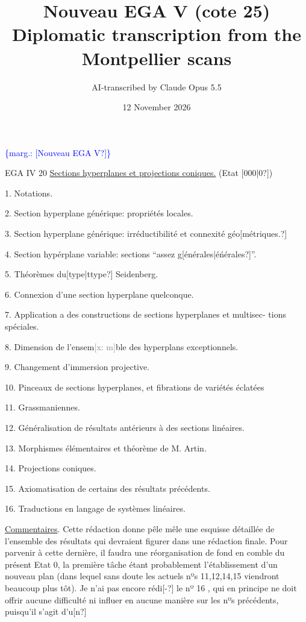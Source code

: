 \documentclass[11pt]{article}
\title{Nouveau EGA V (cote 25)\\[4pt]\large Diplomatic transcription from the Montpellier scans}
\author{AI-transcribed by Claude Opus 5.5}
\date{12 November 2026}
\newcommand{\scanpage}[1]{\par\bigskip\noindent{\small\sffamily[scan #1]}\par}
\newcommand{\mspage}[1]{{\small\sffamily[p.\,#1]}}
\newcommand{\margin}[1]{\textcolor{blue}{\{\textsf{marg.:} #1\}}}
\newcommand{\xout}[1]{\textcolor{gray}{[\textsf{x:} #1]}}
\newcommand{\uline}[1]{\underline{#1}}
\newcommand{\unsure}[1]{[#1?]}
\begin{document}
\maketitle

\scanpage{25/2}
\margin{\unsure{Nouveau EGA V}} \mspage{0}

EGA IV 20 \quad \uline{Sections hyperplanes et projections coniques.} (Etat \unsure{000|0})

1. Notations.

2. Section hyperplane générique: propriétés locales.

3. Section hyperplane générique: irréductibilité et connexité géo\unsure{métriques.}

4. Section hypérplane variable: sections ``assez g\unsure{énérales|éńérales}''.

5. Théorèmes du\unsure{type|ttype} Seidenberg.

6. Connexion d'une section hyperplane quelconque.

7. Application a des constructions de sections hyperplanes et multisec-%
tions spéciales.

8. Dimension de l'ensem\xout{m}ble  des hyperplans exceptionnels.

9. Changement d'immersion projective.

10. Pinceaux de sections hyperplanes, et fibrations de variétés éclatées

11. Grassmaniennes.

12. Généralisation de résultats antérieurs à des sections linéaires.

13. Morphismes élémentaires et théorème de M. Artin.

14. Projections coniques.

15. Axiomatisation de certains des résultats précédents.

16. Traductions en langage de systèmes linéaires.

\uline{Commentaires}. Cette rédaction donne pêle mêle  une esquisse détaillée
de l'ensemble des résultats qui devraient figurer dans une rédaction
finale. Pour parvenir à cette dernière, il faudra une réorganisation de
fond en comble  du présent Etat 0, la première tâche étant probablement
l'établissement d'un nouveau plan (dans lequel sans doute  les actuels
nºs 11,12,14,15  viendront beaucoup plus tôt). Je n'ai pas encore rédi\unsure{-}
le nº 16 , qui en principe ne doit offrir aucune difficulté ni
influer en aucune manière sur les nºs précédents, puisqu'il s'agit d'u\unsure{n}
\end{document}
